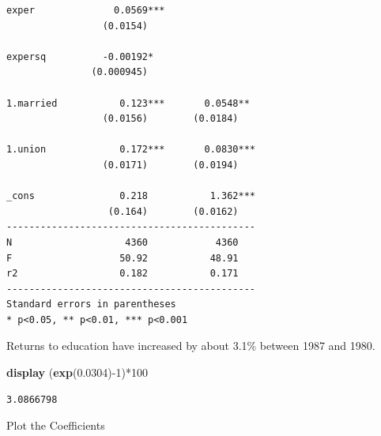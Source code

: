 \documentclass[
]{book}
\newenvironment{Shaded}{\begin{snugshade}}{\end{snugshade}}
\newcommand{\FunctionTok}[1]{\textcolor[rgb]{0.13,0.29,0.53}{\textbf{#1}}}
\newcommand{\KeywordTok}[1]{\textcolor[rgb]{0.13,0.29,0.53}{\textbf{#1}}}
\newcommand{\NormalTok}[1]{#1}
\begin{document}
\begin{verbatim}
exper              0.0569***                
                 (0.0154)                   

expersq          -0.00192*                  
               (0.000945)                   

1.married           0.123***       0.0548** 
                 (0.0156)        (0.0184)   

1.union             0.172***       0.0830***
                 (0.0171)        (0.0194)   

_cons               0.218           1.362***
                  (0.164)        (0.0162)   
--------------------------------------------
N                    4360            4360   
F                   50.92           48.91   
r2                  0.182           0.171   
--------------------------------------------
Standard errors in parentheses
* p<0.05, ** p<0.01, *** p<0.001
\end{verbatim}

Returns to education have increased by about 3.1\% between 1987 and 1980.

\begin{Shaded}
\begin{Highlighting}[]
\KeywordTok{display}\NormalTok{ (}\FunctionTok{exp}\NormalTok{(0.0304){-}1)*100}
\end{Highlighting}
\end{Shaded}

\begin{verbatim}
3.0866798
\end{verbatim}

Plot the Coefficients
\end{document}
